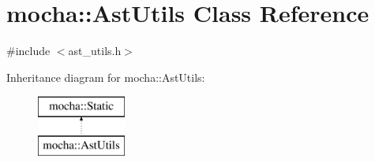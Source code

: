 \hypertarget{classmocha_1_1_ast_utils}{
\section{mocha::AstUtils Class Reference}
\label{classmocha_1_1_ast_utils}
}


{\ttfamily \#include $<$ast\_\-utils.h$>$}

Inheritance diagram for mocha::AstUtils:\begin{figure}[H]
\begin{center}
\leavevmode
\includegraphics[height=2.000000cm]{classmocha_1_1_ast_utils}
\end{center}
\end{figure}
